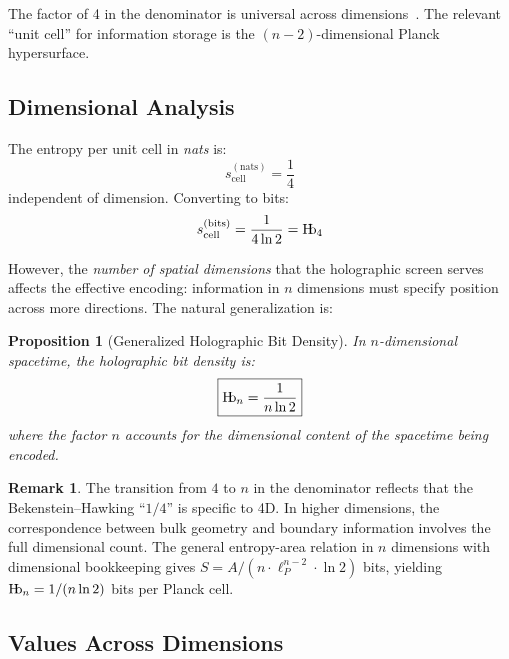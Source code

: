\documentclass[11pt,a4paper]{article}
\theoremstyle{plain}
\newtheorem{proposition}[theorem]{Proposition}
\theoremstyle{definition}
\newtheorem{remark}[theorem]{Remark}
\newcommand{\Hb}{\textnormal{H\kern-0.3em b}}
\newcommand{\Hbn}{\Hb_n}
\newcommand{\Hbfour}{\Hb_4}
\newcommand{\lp}{\ell_P}
\begin{document}
The factor of 4 in the denominator is universal across dimensions~\cite{Myers1986}. The relevant ``unit cell'' for information storage is the $(n-2)$-dimensional Planck hypersurface.

\subsection{Dimensional Analysis}

The entropy per unit cell in \emph{nats} is:
\begin{equation}
s_{\text{cell}}^{(\text{nats})} = \frac{1}{4}
\end{equation}
independent of dimension. Converting to bits:
\begin{equation}
s_{\text{cell}}^{(\text{bits})} = \frac{1}{4\ln 2} = \Hbfour
\end{equation}

However, the \emph{number of spatial dimensions} that the holographic screen serves affects the effective encoding: information in $n$ dimensions must specify position across more directions. The natural generalization is:

\begin{proposition}[Generalized Holographic Bit Density]
\label{prop:Hbn}
In $n$-dimensional spacetime, the holographic bit density is:
\begin{equation}
\boxed{\Hbn = \frac{1}{n \ln 2}}
\label{eq:Hbn}
\end{equation}
where the factor $n$ accounts for the dimensional content of the spacetime being encoded.
\end{proposition}

\begin{remark}
The transition from $4$ to $n$ in the denominator reflects that the Bekenstein--Hawking ``$1/4$'' is specific to 4D. In higher dimensions, the correspondence between bulk geometry and boundary information involves the full dimensional count. The general entropy-area relation in $n$ dimensions with dimensional bookkeeping gives $S = A/(n \cdot \lp^{n-2} \cdot \ln 2)$ bits, yielding $\Hbn = 1/(n\ln 2)$ bits per Planck cell.
\end{remark}

\subsection{Values Across Dimensions}
\end{document}
